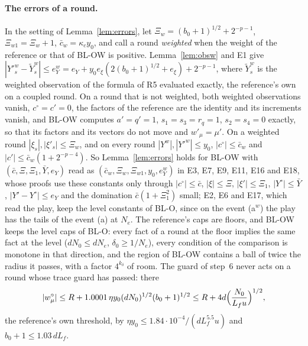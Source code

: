 \documentclass[11pt]{amsart}
\theoremstyle{definition}
\numberwithin{equation}{section}
\begin{document}
\paragraph{The errors of a round.} In the setting of Lemma~\ref{lem:errors}, let $\Xi_w=(b_0+1)^{1/2}+2^{-p-1}$, $\Xi_{w1}=\Xi_w+1$, $\bar c_w=\kappa_cy_0$, and call a round \emph{weighted} when the weight of the reference or that of BL-OW is positive. Lemma~\ref{lem:obsw} and E1 give $|Y'^w_s-\tilde Y^w_s|\le e^w_Y=e_Y+y_0e_\xi(2(b_0+1)^{1/2}+e_\xi)+2^{-p-1}$, where $\tilde Y^w_s$ is the weighted observation of the formula of R5 evaluated exactly, the reference's own on a coupled round. On a round that is not weighted, both weighted observations vanish, $c^\circ=c'=0$, the factors of the reference are the identity and its increments vanish, and BL-OW computes $a'=q'=1$, $s_1=s_3=r_q=1$, $s_2=s_4=0$ exactly, so that its factors and its vectors do not move and $w'_\mu=\mu'$. On a weighted round $|\xi_s|,|\xi'_s|\le\Xi_w$, and on every round $|Y^w|,|Y'^w|\le y_0$, $|c^\circ|\le\bar c_w$ and $|c'|\le\bar c_w(1+2^{-p-4})$. So Lemma~\ref{lem:errors} holds for BL-OW with $(\bar c,\Xi,\Xi_1,\bar Y,e_Y)$ read as $(\bar c_w,\Xi_w,\Xi_{w1},y_0,e^w_Y)$ in E3, E7, E9, E11, E16 and E18, whose proofs use these constants only through $|c^\circ|\le\bar c$, $|\xi|\le\Xi$, $|\xi'|\le\Xi_1$, $|Y^\circ|\le\bar Y$, $|Y'-Y^\circ|\le e_Y$ and the domination $\bar c(1+\Xi_1^2)$ small; E2, E6 and E17, which read the play, keep the level constants of BL-O, since on the event (a$^w$) the play has the tails of the event (a) at $N_e$. The reference's caps are floors, and BL-OW keeps the level caps of BL-O: every fact of a round at the floor implies the same fact at the level ($dN_0\le dN_e$, $\delta_0\ge1/N_e$), every condition of the comparison is monotone in that direction, and the region of BL-OW contains a ball of twice the radius it passes, with a factor $4^{k_\delta}$ of room. The guard of step~6 never acts on a round whose trace guard has passed: there
\[
|w^\circ_\mu|\le R+1.0001\,\eta y_0(dN_0)^{1/2}(b_0+1)^{1/2}\le R+4d\Bigl(\frac{N_0}{L_fu}\Bigr)^{1/2},
\]
the reference's own threshold, by $\eta y_0\le1.84\cdot10^{-4}/(dL_f^{5.5}u)$ and $b_0+1\le1.03\,dL_f$.
\end{document}

